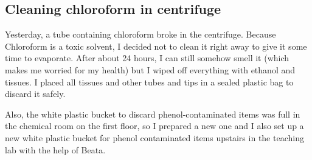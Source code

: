 \subsection{Cleaning chloroform in centrifuge}
\label{task:20180111_cj0}

Yesterday, a tube containing chloroform broke in the centrifuge. Because Chloroform is a toxic solvent, I decided not to clean it right away to give it some time to evaporate. After about 24 hours, I can still somehow smell it (which makes me worried for my health) but I wiped off everything with ethanol and tissues. I placed all tissues and other tubes and tips in a sealed plastic bag to discard it safely. 

Also, the white plastic bucket to discard phenol-contaminated items was full in the chemical room on the first floor, so I prepared a new one and I also set up a new white plastic bucket for phenol contaminated items upstairs in the teaching lab with the help of Beata.